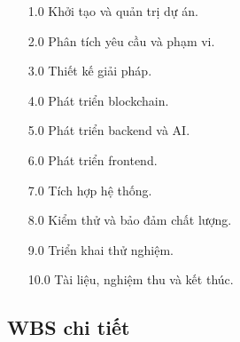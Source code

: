 \begin{enumerate}
  \item[1.0] Khởi tạo và quản trị dự án.
  \item[2.0] Phân tích yêu cầu và phạm vi.
  \item[3.0] Thiết kế giải pháp.
  \item[4.0] Phát triển blockchain.
  \item[5.0] Phát triển backend và AI.
  \item[6.0] Phát triển frontend.
  \item[7.0] Tích hợp hệ thống.
  \item[8.0] Kiểm thử và bảo đảm chất lượng.
  \item[9.0] Triển khai thử nghiệm.
  \item[10.0] Tài liệu, nghiệm thu và kết thúc.
\end{enumerate}


\iffalse
\subsection{WBS chi tiết}

